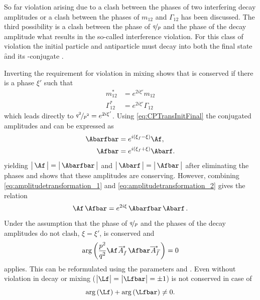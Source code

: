 So far \CP violation arising due to a clash between the phases of two interfering decay amplitudes or a clash between the phases of $m_{12}$ and $\Gamma_{12}$ has been discussed.
The third possibility is a clash between the phase of $\nicefrac{q}{p}$ and the phase of the decay amplitude what results in the so-called interference \CP violation.
For this class of \CP violation the initial particle \Paz and antiparticle \Pazb must decay into both the final state \f and its \CP-conjugate \fbar.

Inverting the requirement for \CP violation in mixing shows that \CP is conserved if there is a phase $\xi'$ such that
\begin{equation}
\begin{split}
m_{12}^\ast &= e^{2i\xi'}m_{12}\\
\Gamma_{12}^\ast &= e^{2i\xi'}\Gamma_{12}\label{eq:CPconservationMixing}
\end{split}
\end{equation}
which leads directly to $\nicefrac{q^2}{p^2} = e^{2i\xi'}$.
Using \cref{eq:CPTransInitFinal} the \CP conjugated amplitudes \Abarfbar and \Afbar can be expressed as
\begin{align}
\Abarfbar&=e^{i\left(\xi_f-\xi\right)}\Af,\label{eq:amplitudetransformation_1}\\
\Afbar&=e^{i\left(\xi_f+\xi\right)}\Abarf.\label{eq:amplitudetransformation_2}
\end{align}
yielding $\big|\,\Af\,\big|=\big|\,\Abarfbar\,\big|$ and $\big|\,\Abarf\,\big|=\big|\,\Afbar\,\big|$ after eliminating the phases and shows that these amplitudes are \CP conserving.
However, combining \cref{eq:amplitudetransformation_1} and \cref{eq:amplitudetransformation_2} gives the relation
\begin{equation}
\Af\,\Afbar=e^{2i\xi}\,\Abarfbar\,\Abarf\,.
\end{equation}
Under the assumption that the phase of $\nicefrac{q}{p}$ and the phases of the decay amplitudes do not clash, \ie $\xi=\xi'$, \CP is conserved and
\begin{equation}
\arg\left(\frac{p^2}{q^2}\Af \,\overline{\kern -1.0pt A\kern -1.0pt}_{\kern 1.0pt f}^\ast\,\Afbar\overline{\kern -1.0pt \,A\kern -1.0pt}_{\kern 2.5pt\overline{\kern -1.5pt f\kern 1.5pt}}^\ast\right)=0
\end{equation}
applies.
This can be reformulated using the parameters \Lf and \Lfbar.
Even without \CP violation in decay or mixing ($\big|\Lf\big|=\big|\Lfbar\big| = \pm1$) \CP is not conserved in case of
\begin{equation}
	\arg\left(\Lf\right)+\arg\left(\Lfbar\right)\neq0. \label{eq:conditionCPV}
\end{equation}
